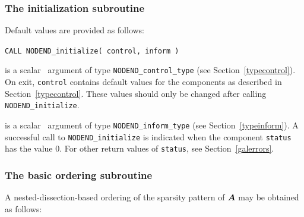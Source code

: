\documentclass{galahad}
\newcommand{\packagename}{NODEND}
\begin{document}

\galarguments


\subsubsection{The initialization subroutine}\label{subinit}
 Default values are provided as follows:
\vspace*{1mm}

\hspace{8mm}
{\tt CALL \packagename\_initialize( control, inform )}

\vspace*{-3mm}
\begin{description}

 is a scalar \intentout\ argument of type
{\tt \packagename\_control\_type}
(see Section~\ref{typecontrol}).
On exit, {\tt control} contains default values for the components as
described in Section~\ref{typecontrol}.
These values should only be changed after calling
{\tt \packagename\_initialize}.

 is a scalar \intentout\ argument of type
{\tt \packagename\_inform\_type}
(see Section~\ref{typeinform}). A successful call to
{\tt \packagename\_initialize}
is indicated when the  component {\tt status} has the value 0.
For other return values of {\tt status}, see Section~\ref{galerrors}.

\end{description}


\subsubsection{The basic ordering subroutine}\label{suborder}
A nested-dissection-based ordering of the sparsity pattern of ${\bm{A}}$ 
may be obtained as follows:
\vskip2mm
\end{document}
